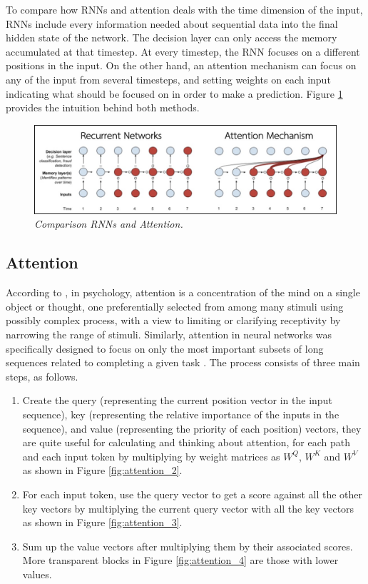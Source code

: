 To compare how RNNs and attention deals with the time dimension of the input, RNNs include every information needed about sequential data into the final hidden state of the network. The decision layer can only access the memory accumulated at that timestep. At every timestep, the RNN focuses on a different positions in the input. On the other hand, an attention mechanism can focus on any of the input from several timesteps, and setting weights on each input indicating what should be focused on in order to make a prediction. Figure \ref{fig:rnnvsattention} provides the intuition behind both methods.

\begin{figure}[H]
  \centering
  \caption[Comparison RNNs and Attention.]{\emph{Comparison RNNs and Attention.}}\label{fig:rnnvsattention}
  \includegraphics[scale = 0.4
  ]{figures/rnnvsattention.jpg}
\end{figure}
\subsection{Attention}

According to \citeauthor{james_1890} \citeyear{james_1890}, in psychology, attention is a concentration of the mind on a single object or thought, one preferentially selected from among many stimuli using possibly complex process, with a view to limiting or clarifying receptivity by narrowing the range of stimuli. Similarly, attention in neural networks was specifically designed to focus on only the most important subsets of long sequences related to completing a given task \cite{alammar_2018,alammar_2019,klingenbrunn_2021}. The process consists of three main steps, as follows.
\begin{enumerate}
  \item Create the query (representing the current position vector in the input sequence), key (representing the relative importance of the inputs in the sequence), and value (representing the priority of each position) vectors, they are quite useful for calculating and thinking about attention, for each path and each input token by multiplying by weight matrices as $W^Q$, $W^K$ and $W^V$ as shown in Figure \ref{fig:attention_2}.
  \item For each input token, use the query vector to get a score against all the other key vectors by multiplying the current query vector with all the key vectors as shown in Figure \ref{fig:attention_3}.
  \item Sum up the value vectors after multiplying them by their associated scores. More transparent blocks in Figure \ref{fig:attention_4} are those with lower values.

\end{enumerate}


